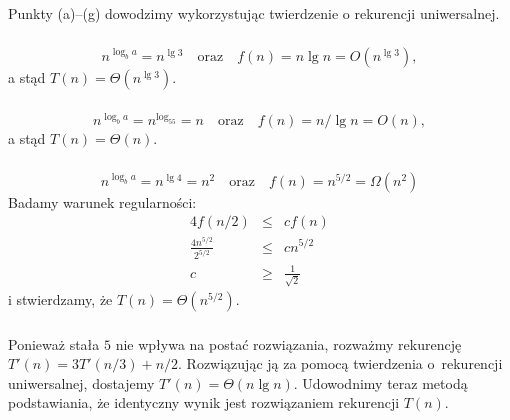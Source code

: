 \subsection{} %
Punkty (a)--(g) dowodzimy wykorzystując twierdzenie o rekurencji uniwersalnej.

\subsubsection{} %
\[
	n^{\log_ba}=n^{\lg 3}\quad\mbox{oraz}\quad f(n)=n\lg n=O(n^{\lg 3}),
\]
a stąd $T(n)=\Theta(n^{\lg 3})$.

\subsubsection{} %
\[
	n^{\log_ba}=n^{\log_55}=n\quad\mbox{oraz}\quad f(n)=n/\lg n=O(n),
\]
a stąd $T(n)=\Theta(n)$.

\subsubsection{} %
\[
	n^{\log_ba}=n^{\lg 4}=n^2\quad\mbox{oraz}\quad f(n)=n^{5/2}=\Omega(n^2)
\]
Badamy warunek regularności:
\begin{eqnarray*}
	4f(n/2) &\le& cf(n) \\
	\frac{4n^{5/2}}{2^{5/2}} &\le& cn^{5/2} \\
	c &\ge& \frac{1}{\sqrt{2}}
\end{eqnarray*}
i stwierdzamy, że $T(n)=\Theta(n^{5/2})$.

\subsubsection{} %
Ponieważ stała $5$ nie wpływa na postać rozwiązania, rozważmy rekurencję $T'(n)=3T'(n/3)+n/2$. Rozwiązując ją za pomocą twierdzenia o~rekurencji uniwersalnej, dostajemy $T'(n)=\Theta(n\lg n)$. Udowodnimy teraz metodą podstawiania, że identyczny wynik jest rozwiązaniem rekurencji $T(n)$.

